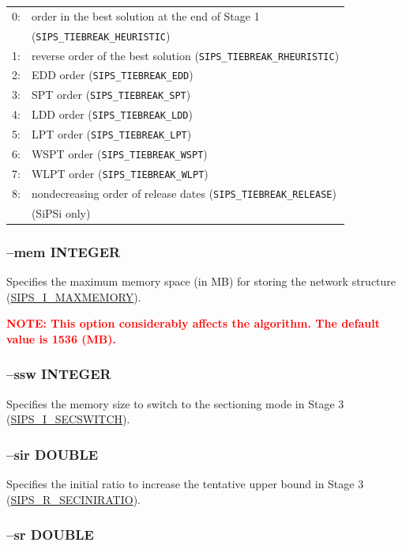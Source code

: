 \documentclass[a4paper]{book}
\begin{document}
\begin{tabular}{r@{~}l}
  0: & order in the best solution at the end of Stage 1\\
  & (\verb+SIPS_TIEBREAK_HEURISTIC+)\\
  1: & reverse order of the best solution
  (\verb+SIPS_TIEBREAK_RHEURISTIC+)\\
  2: & EDD order (\verb+SIPS_TIEBREAK_EDD+)\\
  3: & SPT order (\verb+SIPS_TIEBREAK_SPT+)\\
  4: & LDD order (\verb+SIPS_TIEBREAK_LDD+)\\
  5: & LPT order (\verb+SIPS_TIEBREAK_LPT+)\\
  6: & WSPT order (\verb+SIPS_TIEBREAK_WSPT+)\\
  7: & WLPT order (\verb+SIPS_TIEBREAK_WLPT+)\\
  8: & nondecreasing order of release dates
  (\verb+SIPS_TIEBREAK_RELEASE+)\\
  & (SiPSi only)\\
\end{tabular}


\subsubsection{--mem INTEGER}

Specifies the maximum memory space (in MB) for storing the network structure\linebreak
(\hyperlink{MAXMEMORY}{SIPS\_I\_MAXMEMORY}).

\medskip

\noindent
\textcolor{red}{\bf NOTE: This option considerably affects the algorithm.
The default value is 1536 (MB).}


\subsubsection{--ssw INTEGER}

Specifies the memory size to switch to the sectioning mode in Stage 3
(\hyperlink{SECSWITCH}{SIPS\_I\_SECSWITCH}).

\subsubsection{--sir DOUBLE}

Specifies the initial ratio to increase the tentative upper bound in Stage 3
(\hyperlink{SECINIRATIO}{SIPS\_R\_SECINIRATIO}).

\subsubsection{--sr DOUBLE}
\end{document}

